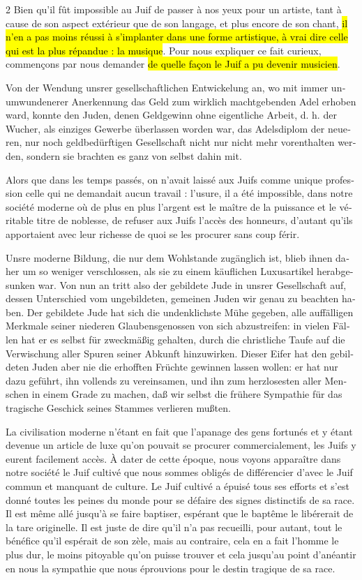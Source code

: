 \documentclass[a4paper,12pt]{article}
\newcommand\chunks[2]{%
\begin{leftcolumn*}\begin{otherlanguage}{german}%
{#1}%
\end{otherlanguage}\end{leftcolumn*}%
\begin{rightcolumn}\begin{otherlanguage}{french}%
{#2}%
\end{otherlanguage}\end{rightcolumn}%
}
\begin{document}
\begin{paracol}{2}
         {Bien qu’il fût impossible au Juif de passer à nos yeux pour un artiste, tant à cause de son aspect extérieur que de son langage, et plus encore de son chant, \hl{il n’en a pas moins réussi à s’implanter dans une forme artistique, à vrai dire celle qui est la plus répandue : la musique}. Pour nous expliquer ce fait curieux, commençons par nous demander \hl{de quelle façon le Juif a pu devenir musicien}.}
  \chunks{Von der Wendung unsrer gesellschaftlichen Entwickelung an, wo mit immer unumwundenerer Anerkennung das Geld zum wirklich machtgebenden Adel erhoben ward, konnte den Juden, denen Geldgewinn ohne eigentliche Arbeit, d. h. der Wucher, als einziges Gewerbe überlassen worden war, das Adelsdiplom der neueren, nur noch geldbedürftigen Gesellschaft nicht nur nicht mehr vorenthalten werden, sondern sie brachten es ganz von selbst dahin mit.}
         {Alors que dans les temps passés, on n’avait laissé aux Juifs comme unique profession celle qui ne demandait aucun travail : l’usure, il a été impossible, dans notre société moderne où de plus en plus l’argent est le maître de la puissance et le véritable titre de noblesse, de refuser aux Juifs l’accès des honneurs, d’autant qu’ils apportaient avec leur richesse de quoi se les procurer sans coup férir.}
  \chunks{Unsre moderne Bildung, die nur dem Wohlstande zugänglich ist, blieb ihnen daher um so weniger verschlossen, als sie zu einem käuflichen Luxusartikel herabgesunken war. Von nun an tritt also der gebildete Jude in unsrer Gesellschaft auf, dessen Unterschied vom ungebildeten, gemeinen Juden wir genau zu beachten haben. Der gebildete Jude hat sich die undenklichste Mühe gegeben, alle auffälligen Merkmale seiner niederen Glaubensgenossen von sich abzustreifen: in vielen Fällen hat er es selbst für zweckmäßig gehalten, durch die christliche Taufe auf die Verwischung aller Spuren seiner Abkunft hinzuwirken. Dieser Eifer hat den gebildeten Juden aber nie die erhofften Früchte gewinnen lassen wollen: er hat nur dazu geführt, ihn vollends zu vereinsamen, und ihn zum herzlosesten aller Menschen in einem Grade zu machen, daß wir selbst die frühere Sympathie für das tragische Geschick seines Stammes verlieren mußten.}
         {La civilisation moderne n’étant en fait que l’apanage des gens fortunés et y étant devenue un article de luxe qu’on pouvait se procurer commercialement, les Juifs y eurent facilement accès. À dater de cette époque, nous voyons apparaître dans notre société le Juif cultivé que nous sommes obligés de différencier d’avec le Juif commun et manquant de culture. Le Juif cultivé a épuisé tous ses efforts et s’est donné toutes les peines du monde pour se défaire des signes distinctifs de sa race. Il est même allé jusqu’à se faire baptiser, espérant que le baptême le libérerait de la tare originelle. Il est juste de dire qu’il n’a pas recueilli, pour autant, tout le bénéfice qu’il espérait de son zèle, mais au contraire, cela en a fait l’homme le plus dur, le moins pitoyable qu’on puisse trouver et cela jusqu’au point d’anéantir en nous la sympathie que nous éprouvions pour le destin tragique de sa race.}

\end{paracol}
\end{document}
